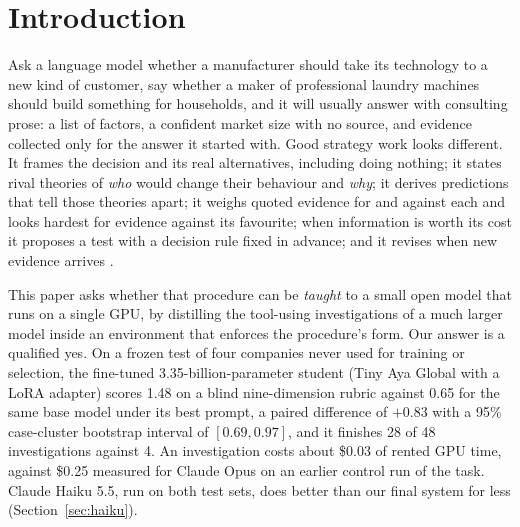 \section{Introduction}\label{sec:intro}

Ask a language model whether a manufacturer should take its technology to a new kind of customer, say whether a maker
of professional laundry machines should build something for households, and it will usually answer with consulting
prose: a list of factors, a confident market size with no source, and evidence collected only for the answer it started
with. Good strategy work looks different. It frames the decision and its real alternatives, including doing nothing;
it states rival theories of \emph{who} would change their behaviour and \emph{why}; it derives predictions that tell
those theories apart; it weighs quoted evidence for and against each and looks hardest for evidence against its
favourite; when information is worth its cost it proposes a test with a decision rule fixed in advance; and it revises
when new evidence arrives \citep{camuffo2020scientific,camuffo2024theory}.

This paper asks whether that procedure can be \emph{taught} to a small open model that runs on a single GPU, by
distilling the tool-using investigations of a much larger model inside an environment that enforces the procedure's
form. Our answer is a qualified yes. On a frozen test of four companies never used for training or selection, the
fine-tuned 3.35-billion-parameter student (Tiny Aya Global with a LoRA adapter) scores 1.48 on a blind nine-dimension
rubric against 0.65 for the same base model under its best prompt, a paired difference of $+0.83$ with a 95\%
case-cluster bootstrap interval of $[0.69, 0.97]$, and it finishes 28 of 48 investigations against 4. An investigation
costs about \$0.03 of rented GPU time, against \$0.25 measured for Claude Opus on an earlier control run of the task.
Claude Haiku 5.5, run on both test sets, does better than our final system for less (Section~\ref{sec:haiku}).

